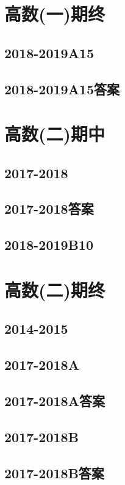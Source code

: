 \documentclass[cn,11pt,fancy,hide]{elegantbook}
\begin{document}
\section{高数(一)期终}
\subsection{2018-2019A15}
\subsection{2018-2019A15答案}




\section{高数(二)期中}
\subsection{2017-2018}
\subsection{2017-2018答案}
\subsection{2018-2019B10}




\section{高数(二)期终}
\subsection{2014-2015}
\subsection{2017-2018A}
\subsection{2017-2018A答案}
\subsection{2017-2018B}
\subsection{2017-2018B答案}
\end{document}
